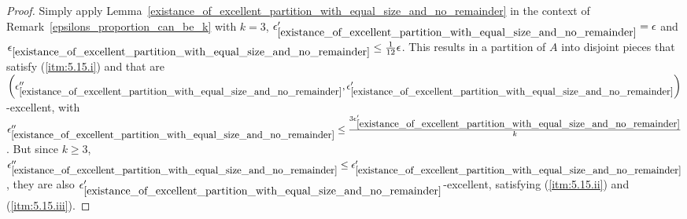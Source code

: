         \begin{proof}
            Simply apply Lemma~\ref{existance_of_excellent_partition_with_equal_size_and_no_remainder} in the context of
            Remark~\ref{epsilons_proportion_can_be_k} with $k = 3$, ${\epsilon'_{\ref{existance_of_excellent_partition_with_equal_size_and_no_remainder}}} = \epsilon$
            and ${\epsilon_{\ref{existance_of_excellent_partition_with_equal_size_and_no_remainder}}} \leq \frac{1}{12} \epsilon$.
            This results in a partition of $A$ into disjoint pieces that satisfy (\ref{itm:5.15.i}) and that are
            $\left( {\epsilon''_{\ref{existance_of_excellent_partition_with_equal_size_and_no_remainder}}},
                \epsilon'_{\ref{existance_of_excellent_partition_with_equal_size_and_no_remainder}} \right)$-excellent,
            with ${\epsilon''_{\ref{existance_of_excellent_partition_with_equal_size_and_no_remainder}}} \leq
                \frac{3 \epsilon'_{\ref{existance_of_excellent_partition_with_equal_size_and_no_remainder}}}{k}$.
            But since $k \geq 3$, ${\epsilon''_{\ref{existance_of_excellent_partition_with_equal_size_and_no_remainder}}} \leq
                \epsilon'_{\ref{existance_of_excellent_partition_with_equal_size_and_no_remainder}}$, they are also
            $\epsilon'_{\ref{existance_of_excellent_partition_with_equal_size_and_no_remainder}}$-excellent, satisfying
            (\ref{itm:5.15.ii}) and (\ref{itm:5.15.iii}).
        \end{proof}

